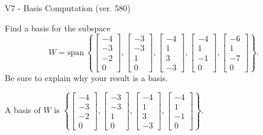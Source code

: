 \begin{exercise}
  \begin{exerciseTitle}V7 - Basis Computation (ver. 580)\end{exerciseTitle}
  \begin{exerciseStatement}
    Find a basis for the subspace 
\[W=\mathrm{span}\ \left\{\left[\begin{array}{r}
-4 \\
-3 \\
-2 \\
0
\end{array}\right] , \left[\begin{array}{r}
-3 \\
-3 \\
1 \\
0
\end{array}\right] , \left[\begin{array}{r}
-4 \\
1 \\
3 \\
-3
\end{array}\right] , \left[\begin{array}{r}
-4 \\
1 \\
-1 \\
0
\end{array}\right] , \left[\begin{array}{r}
-6 \\
1 \\
-7 \\
0
\end{array}\right]\right\}.\]
 Be sure to explain why your result is a basis.


  \end{exerciseStatement}
  \begin{exerciseAnswer}
   A basis of \(W\) is  \(\left\{\left[\begin{array}{r}
-4 \\
-3 \\
-2 \\
0
\end{array}\right] , \left[\begin{array}{r}
-3 \\
-3 \\
1 \\
0
\end{array}\right] , \left[\begin{array}{r}
-4 \\
1 \\
3 \\
-3
\end{array}\right] , \left[\begin{array}{r}
-4 \\
1 \\
-1 \\
0
\end{array}\right]\right\}\).
  


  \end{exerciseAnswer}
\end{exercise}